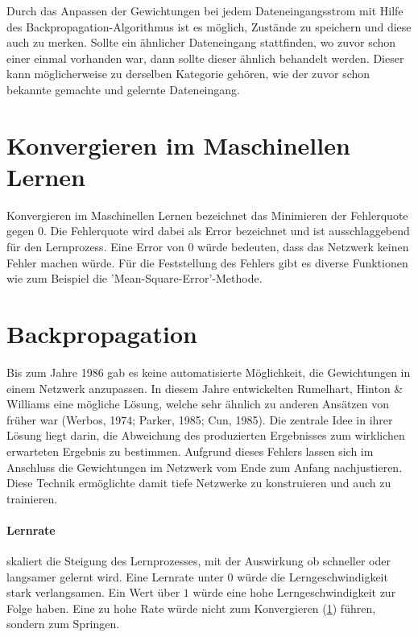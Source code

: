Durch das Anpassen der Gewichtungen bei jedem Dateneingangsstrom mit Hilfe des Backpropagation-Algorithmus ist es möglich, Zustände zu speichern und diese auch zu merken. 
Sollte ein ähnlicher Dateneingang stattfinden, wo zuvor schon einer einmal vorhanden war, dann sollte dieser ähnlich behandelt werden.
Dieser kann möglicherweise zu derselben Kategorie gehören, wie der zuvor schon bekannte gemachte und gelernte Dateneingang.

\section{Konvergieren im Maschinellen Lernen}
\label{sec:Konvergieren}

Konvergieren im Maschinellen Lernen bezeichnet das Minimieren der Fehlerquote gegen $0$.
Die Fehlerquote wird dabei als Error bezeichnet und ist ausschlaggebend für den Lernprozess.
Eine Error von $0$ würde bedeuten, dass das Netzwerk keinen Fehler machen würde.
Für die Feststellung des Fehlers gibt es diverse Funktionen wie zum Beispiel die 'Mean-Square-Error'-Methode.

\section{Backpropagation}
\label{sec:Backpropagation}

Bis zum Jahre 1986 gab es keine automatisierte Möglichkeit, die Gewichtungen in einem Netzwerk anzupassen.
In diesem Jahre entwickelten Rumelhart, Hinton \& Williams eine mögliche Lösung, welche sehr ähnlich zu anderen Ansätzen von früher war (Werbos, 1974; Parker, 1985; Cun, 1985).
Die zentrale Idee in ihrer Lösung liegt darin, die Abweichung des produzierten Ergebnisses zum wirklichen erwarteten Ergebnis zu bestimmen. 
Aufgrund dieses Fehlers lassen sich im Anschluss die Gewichtungen im Netzwerk vom Ende zum Anfang nachjustieren. 
Diese Technik ermöglichte damit tiefe Netzwerke zu konstruieren und auch zu trainieren.

\paragraph{Lernrate} skaliert die Steigung des Lernprozesses, mit der Auswirkung ob schneller oder langsamer gelernt wird.
Eine Lernrate unter $0$ würde die Lerngeschwindigkeit stark verlangsamen. 
Ein Wert über $1$ würde eine hohe Lerngeschwindigkeit zur Folge haben. 
Eine zu hohe Rate würde nicht zum Konvergieren (\ref{sec:Konvergieren}) führen, sondern zum Springen.

